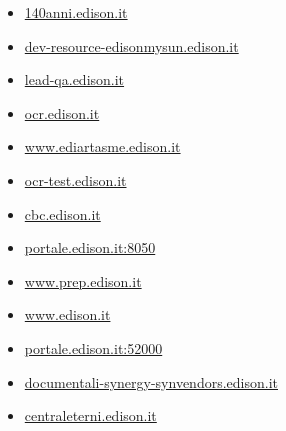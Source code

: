\documentclass{article}
\begin{document}
\begin{itemize}
                
                \item \href{ https://140anni.edison.it/}{ 140anni.edison.it }
            
                
                \item \href{ https://dev-resource-edisonmysun.edison.it/}{ dev-resource-edisonmysun.edison.it }
            
                
                \item \href{ http://lead-qa.edison.it/}{ lead-qa.edison.it }
            
                
                \item \href{ http://ocr.edison.it/}{ ocr.edison.it }
            
                
                \item \href{ http://www.ediartasme.edison.it/}{ www.ediartasme.edison.it }
            
                
                \item \href{ http://ocr-test.edison.it/}{ ocr-test.edison.it }
            
                
                \item \href{ http://cbc.edison.it/}{ cbc.edison.it }
            
                
                \item \href{ https://portale.edison.it:8050/sap(bD1pdCZjPTIyMCZkPW1pbg==)/bc/bsp/sap/zpqf\_bsp\_app/initial\_it.htm}{ portale.edison.it:8050 }
            
                
                \item \href{ http://www.prep.edison.it/}{ www.prep.edison.it }
            
                
                \item \href{ https://www.edison.it/it}{ www.edison.it }
            
                
                \item \href{ https://portale.edison.it:52000/irj/portal}{ portale.edison.it:52000 }
            
                
                \item \href{ https://documentali-synergy-synvendors.edison.it/account/login?ReturnUrl=\%2Fvefa\%2Fhome}{ documentali-synergy-synvendors.edison.it }
            
                
                \item \href{ http://centraleterni.edison.it/}{ centraleterni.edison.it }
            

\end{itemize}
\end{document}
